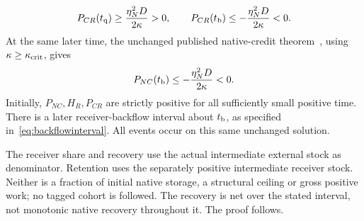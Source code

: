 \begin{theorem}
\begin{equation}\label{eq:receiverwitnesses}%
P_{CR}(t_{\rm q})\ge\frac{\eta_N^2D}{2\kappa}>0,\qquad
P_{CR}(t_{\rm b})\le-\frac{\eta_N^2D}{2\kappa}<0.
\end{equation}
At the same later time, the unchanged published native-credit theorem~\cite[Theorem 3.1]{p2}, using $\kappa\ge\kappa_{\rm crit}$, gives
\begin{equation}\label{eq:nativewitness}%
P_{NC}(t_{\rm b})\le-\frac{\eta_N^2D}{2\kappa}<0 .
\end{equation}
Initially, $P_{NC},H_R,P_{CR}$ are strictly positive for all sufficiently small positive time. There is a later receiver-backflow interval about $t_{\rm b}$, as specified in~\eqref{eq:backflowinterval}. All events occur on this same unchanged solution.
\end{theorem}

The receiver share and recovery use the actual intermediate external stock as denominator. Retention uses the separately positive intermediate receiver stock. Neither is a fraction of initial native storage, a structural ceiling or gross positive work; no tagged cohort is followed. The recovery is net over the stated interval, not monotonic native recovery throughout it. The proof follows.
